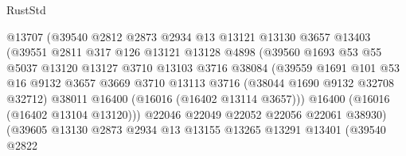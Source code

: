 \begin{lexlean}{RustStd}
\begin{coremodule}
                              @13707
                              (@39540
                                @2812
                                @2873
                                @2934
                                @13
                                @13121
                                @13130
                                @3657
                                @13403
                                (@39551
                                  @2811
                                  @317
                                  @126
                                  @13121
                                  @13128
                                  @4898
                                  (@39560
                                    @1693
                                    @53
                                    @55
                                    @5037
                                    @13120
                                    @13127
                                    @3710
                                    @13103
                                    @3716
                                    @38084
                                    (@39559
                                      @1691
                                      @101
                                      @53
                                      @16
                                      @9132
                                      @3657
                                      @3669
                                      @3710
                                      @13113
                                      @3716
                                      (@38044 @1690 @9132 @32708 @32712)
                                      @38011
                                      @16400
                                      (@16016 (@16402 @13114 @3657)))
                                    @16400
                                    (@16016 (@16402 @13104 @13120)))
                                  @22046
                                  @22049
                                  @22052
                                  @22056
                                  @22061
                                  @38930)
                                (@39605
                                  @13130
                                  @2873
                                  @2934
                                  @13
                                  @13155
                                  @13265
                                  @13291
                                  @13401
                                  (@39540
                                    @2822

\end{coremodule}
\end{lexlean}

